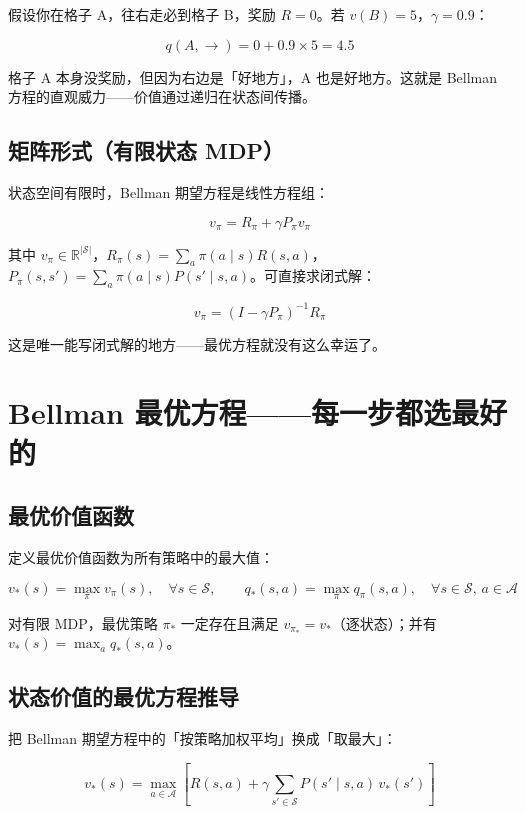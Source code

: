 \documentclass{article}
\begin{document}
假设你在格子 A，往右走必到格子 B，奖励 $R=0$。若 $v(B)=5$，$\gamma=0.9$：

\[
q(A, \rightarrow) = 0 + 0.9 \times 5 = 4.5
\]

格子 A 本身没奖励，但因为右边是「好地方」，A 也是好地方。这就是 Bellman 方程的直观威力——价值通过递归在状态间传播。

\subsection*{矩阵形式（有限状态 MDP）}

状态空间有限时，Bellman 期望方程是线性方程组：

\[
\boxed{v_\pi = R_\pi + \gamma P_\pi v_\pi}
\]

其中 $v_\pi\in\mathbb{R}^{|\mathcal{S}|}$，$R_\pi(s)=\sum_a \pi(a\mid s)R(s,a)$，$P_\pi(s,s')=\sum_a \pi(a\mid s)P(s'\mid s,a)$。可直接求闭式解：

\[
v_\pi = (I - \gamma P_\pi)^{-1} R_\pi
\]

这是唯一能写闭式解的地方——最优方程就没有这么幸运了。

\section*{Bellman 最优方程——每一步都选最好的}

\subsection*{最优价值函数}

定义最优价值函数为所有策略中的最大值：

\[
v_*(s) = \max_\pi v_\pi(s),\quad \forall s\in\mathcal{S}, \qquad
q_*(s,a) = \max_\pi q_\pi(s,a),\quad \forall s\in\mathcal{S},\, a\in\mathcal{A}
\]

对有限 MDP，最优策略 $\pi_*$ 一定存在且满足 $v_{\pi_*}=v_*$（逐状态）；并有 $v_*(s)=\max_a q_*(s,a)$。

\subsection*{状态价值的最优方程推导}

把 Bellman 期望方程中的「按策略加权平均」换成「取最大」：

\[
\boxed{v_*(s) = \max_{a\in\mathcal{A}} \left[ R(s,a) + \gamma \sum_{s'\in\mathcal{S}} P(s'\mid s,a)\, v_*(s') \right]}
\]
\end{document}
